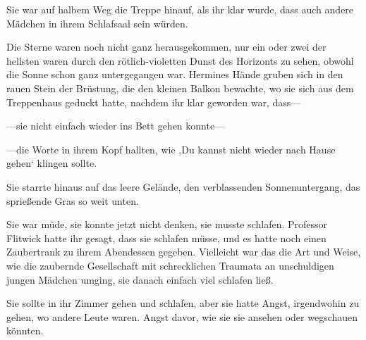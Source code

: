 Sie war auf halbem Weg die Treppe hinauf, als ihr klar wurde, dass auch andere Mädchen in ihrem Schlafsaal sein würden.

\later

Die Sterne waren noch nicht ganz herausgekommen, nur ein oder zwei der hellsten waren durch den rötlich-violetten Dunst des Horizonts zu sehen, obwohl die Sonne schon ganz untergegangen war.
%
Hermines Hände gruben sich in den rauen Stein der Brüstung, die den kleinen Balkon bewachte, wo sie sich aus dem Treppenhaus geduckt hatte, nachdem ihr klar geworden war, dass—

—sie nicht einfach wieder ins Bett gehen konnte—

—die Worte in ihrem Kopf hallten, wie ‚Du kannst nicht wieder nach Hause gehen‘ klingen sollte.

Sie starrte hinaus auf das leere Gelände, den verblassenden Sonnenuntergang, das sprießende Gras so weit unten.

Sie war müde, sie konnte jetzt nicht denken, sie musste schlafen. Professor Flitwick hatte ihr gesagt, dass sie schlafen müsse, und es hatte noch einen Zaubertrank zu ihrem Abendessen gegeben.
Vielleicht war das die Art und Weise, wie die zaubernde Gesellschaft mit schrecklichen Traumata an unschuldigen jungen Mädchen umging, sie danach einfach viel schlafen ließ.

Sie sollte in ihr Zimmer gehen und schlafen, aber sie hatte Angst, irgendwohin zu gehen, wo andere Leute waren. Angst davor, wie sie sie ansehen oder wegschauen könnten.

